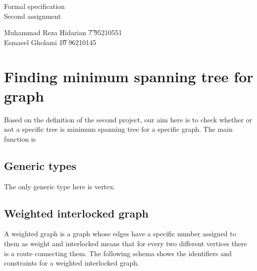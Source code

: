 \documentclass{article}
\begin{document}
\begin{center}
\begin{Huge}
Formal specification \\

{\huge Second assignment\\}
\end{Huge}
\begin{large}
\begin{flushleft}
Muhammad Reza Hidarian \t7 95210551
\\Esmaeel Gholami \t10 96210145
\end{flushleft}	
\end{large}\end{center}

\section{Finding minimum spanning tree for graph}

Based on the definition of the second project, our aim here is to check whether or not a specific tree is minimum spanning tree for a specific graph. The main function is 

\subsection*{Generic types}
The only generic type here is vertex.
\begin{zed}
  [Vertex]
\end{zed}

\subsection*{Weighted interlocked graph}
A weighted graph is a graph whose edges have a specific number assigned to them as weight and interlocked means that for every two different vertices there is a route connecting them. The following schema shows the identifiers and constraints for a weighted interlocked graph.
\end{document}
